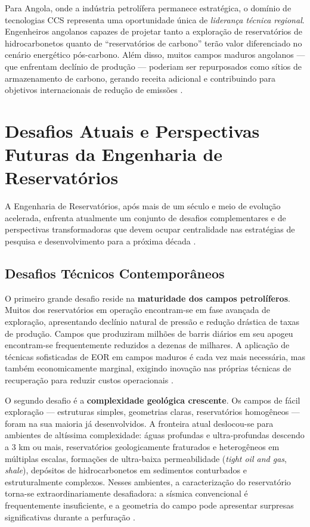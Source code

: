 \documentclass[
  12pt,
  a4paper,
  oneside,
  brazilian,
  sumario=tradicional
]{abntex2}
\begin{document}
Para Angola, onde a indústria petrolífera permanece estratégica, o domínio
de tecnologias CCS representa uma oportunidade única de \textit{liderança
técnica regional}. Engenheiros angolanos capazes de projetar tanto a
exploração de reservatórios de hidrocarbonetos quanto de ``reservatórios
de carbono'' terão valor diferenciado no cenário energético pós-carbono.
Além disso, muitos campos maduros angolanos — que enfrentam declínio de
produção — poderiam ser repurposados como sítios de armazenamento de
carbono, gerando receita adicional e contribuindo para objetivos
internacionais de redução de emissões \cite{bachu2000}.

\section{Desafios Atuais e Perspectivas Futuras da Engenharia de Reservatórios}
\label{sec:desafios_futuro}

A Engenharia de Reservatórios, após mais de um século e meio de evolução
acelerada, enfrenta atualmente um conjunto de desafios complementares e
de perspectivas transformadoras que devem ocupar centralidade nas
estratégias de pesquisa e desenvolvimento para a próxima década
\cite{ahmed2010, terry2015}.

\subsection{Desafios Técnicos Contemporâneos}

O primeiro grande desafio reside na \textbf{maturidade dos campos
petrolíferos}. Muitos dos reservatórios em operação encontram-se em
fase avançada de exploração, apresentando declínio natural de pressão
e redução drástica de taxas de produção. Campos que produziram milhões
de barris diários em seu apogeu encontram-se frequentemente reduzidos
a dezenas de milhares. A aplicação de técnicas sofisticadas de EOR em
campos maduros é cada vez mais necessária, mas também economicamente
marginal, exigindo inovação nas próprias técnicas de recuperação para
reduzir custos operacionais \cite{lake2007}.

O segundo desafio é a \textbf{complexidade geológica crescente}. Os
campos de fácil exploração — estruturas simples, geometrias claras,
reservatórios homogêneos — foram na sua maioria já desenvolvidos.
A fronteira atual deslocou-se para ambientes de altíssima complexidade:
águas profundas e ultra-profundas descendo a 3 km ou mais, reservatórios
geologicamente fraturados e heterogêneos em múltiplas escalas,
formações de ultra-baixa permeabilidade (\textit{tight oil and gas},
\textit{shale}), depósitos de hidrocarbonetos em sedimentos conturbados
e estruturalmente complexos. Nesses ambientes, a caracterização do
reservatório torna-se extraordinariamente desafiadora: a sísmica
convencional é frequentemente insuficiente, e a geometria do campo
pode apresentar surpresas significativas durante a perfuração
\cite{ahmed2010}.
\end{document}
